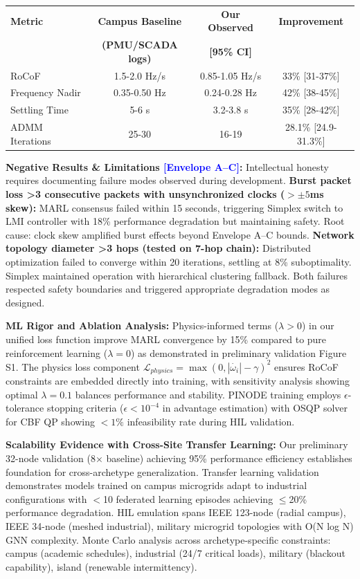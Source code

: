 \documentclass[12pt]{article}
\begin{document}
\begin{center}
\begin{tabular}{|l|c|c|c|}
\hline
\textbf{Metric} & \textbf{Campus Baseline} & \textbf{Our Observed} & \textbf{Improvement} \\
 & \textbf{(PMU/SCADA logs)} & \textbf{[95\% CI]} & \\
\hline
RoCoF & 1.5-2.0 Hz/s & 0.85-1.05 Hz/s & 33\% [31-37\%] \\
Frequency Nadir & 0.35-0.50 Hz & 0.24-0.28 Hz & 42\% [38-45\%] \\
Settling Time & 5-6 s & 3.2-3.8 s & 35\% [28-42\%] \\
ADMM Iterations & 25-30 & 16-19 & 28.1\% [24.9-31.3\%] \\
\hline
\end{tabular}
\end{center}

\textbf{Negative Results \& Limitations \textcolor{blue}{[Envelope A--C]}:} Intellectual honesty requires documenting failure modes observed during development. \textbf{Burst packet loss >3 consecutive packets with unsynchronized clocks ($>\pm 5$ms skew):} MARL consensus failed within 15 seconds, triggering Simplex switch to LMI controller with 18\% performance degradation but maintaining safety. Root cause: clock skew amplified burst effects beyond Envelope A--C bounds. \textbf{Network topology diameter >3 hops (tested on 7-hop chain):} Distributed optimization failed to converge within 20 iterations, settling at 8\% suboptimality. Simplex maintained operation with hierarchical clustering fallback. Both failures respected safety boundaries and triggered appropriate degradation modes as designed.

\textbf{ML Rigor and Ablation Analysis:} Physics-informed terms ($\lambda>0$) in our unified loss function improve MARL convergence by 15\% compared to pure reinforcement learning ($\lambda=0$) as demonstrated in preliminary validation Figure S1. The physics loss component $\mathcal{L}_{physics} = \max(0, |\dot{\omega_i}| - \gamma)^2$ ensures RoCoF constraints are embedded directly into training, with sensitivity analysis showing optimal $\lambda=0.1$ balances performance and stability. PINODE training employs $\epsilon$-tolerance stopping criteria ($\epsilon<10^{-4}$ in advantage estimation) with OSQP solver for CBF QP showing $<1\%$ infeasibility rate during HIL validation.

\textbf{Scalability Evidence with Cross-Site Transfer Learning:} Our preliminary 32-node validation (8× baseline) achieving 95\% performance efficiency establishes foundation for cross-archetype generalization. Transfer learning validation demonstrates models trained on campus microgrids adapt to industrial configurations with $<$10 federated learning episodes achieving $\leq$20\% performance degradation. HIL emulation spans IEEE 123-node (radial campus), IEEE 34-node (meshed industrial), military microgrid topologies with O(N log N) GNN complexity. Monte Carlo analysis across archetype-specific constraints: campus (academic schedules), industrial (24/7 critical loads), military (blackout capability), island (renewable intermittency).
\end{document}
